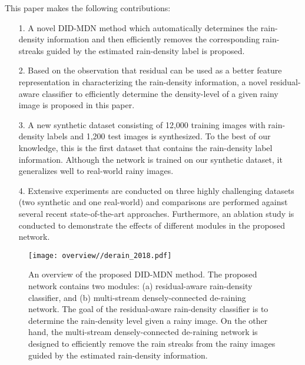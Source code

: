 \documentclass[10pt,twocolumn,letterpaper]{article}
\begin{document}
This paper makes the following contributions:
\begin{itemize}[noitemsep]     
\item[1.]  A novel DID-MDN method which automatically determines the rain-density information and then efficiently removes the corresponding rain-streaks guided by the estimated rain-density label is proposed. 

\item[2.] Based on the observation that residual can be used as a better feature representation in characterizing the rain-density information,  a novel residual-aware classifier to efficiently determine the density-level of a given rainy image is proposed in this paper.
\item[3.] A new synthetic dataset consisting of 12,000 training images with rain-density labels and 1,200 test images is synthesized. To the best of our knowledge, this is the first dataset that contains the rain-density label information.  Although the network is trained on our synthetic dataset,  it generalizes well to real-world rainy images.
\item[4.] Extensive experiments are conducted on three highly
challenging  datasets  (two synthetic and one real-world)  and  comparisons
are  performed  against  several  recent  state-of-the-art
approaches. Furthermore, an ablation study is conducted to
demonstrate the effects of different modules in the proposed network.
\end{itemize}






\begin{figure*}[t]
	\centering
	\begin{minipage}{0.90\textwidth}
		\texttt{[image: overview//derain\_2018.pdf]}
		\captionsetup{labelformat=empty}
		\captionsetup{justification=centering}
	\end{minipage}
	\vskip-20pt
	\caption{An overview of the proposed DID-MDN method. The proposed network contains two modules: (a) residual-aware rain-density classifier, and (b) multi-stream densely-connected de-raining network.  The goal of the residual-aware rain-density classifier is to determine the rain-density level given a rainy image.  On the other hand, the multi-stream densely-connected de-raining network is designed to efficiently remove the rain streaks from the rainy images guided by the  estimated rain-density information.} 
	\label{fig:overview}
\end{figure*}
\end{document}
